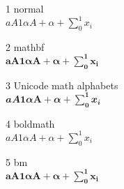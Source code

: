 \documentclass{article}
\begin{document}

1 normal\\
 $aA1αΑ+\alpha + \sum_0^1 x_i$

2 mathbf\\
 $\mathbf{aA1αΑ+\alpha + \sum_0^1 x_i}$

3 Unicode math alphabets\\
 $𝒂𝑨𝟏𝜶𝚨+𝜶 + \sum_𝟎^𝟏 𝒙_𝒊$

4 boldmath\\
 {\boldmath $aA1αΑ+\alpha + \sum_0^1 x_i$}

5 bm\\
 $\bm{aA1αΑ+\alpha + \sum_0^1 x_i}$
\end{document}
